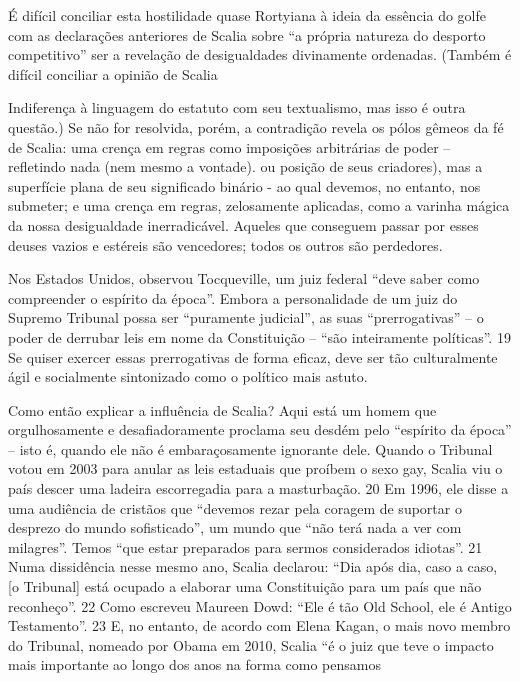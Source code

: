  \par 
É difícil conciliar esta hostilidade quase Rortyiana à ideia da essência do golfe com as declarações anteriores de Scalia sobre “a própria natureza do desporto competitivo” ser a revelação de desigualdades divinamente ordenadas. (Também é difícil conciliar a opinião de Scalia
 \par 
Indiferença à linguagem do estatuto com seu textualismo, mas isso é outra questão.) Se não for resolvida, porém, a contradição revela os pólos gêmeos da fé de Scalia: uma crença em regras como imposições arbitrárias de poder – refletindo nada (nem mesmo a vontade). ou posição de seus criadores), mas a superfície plana de seu significado binário - ao qual devemos, no entanto, nos submeter; e uma crença em regras, zelosamente aplicadas, como a varinha mágica da nossa desigualdade inerradicável. Aqueles que conseguem passar por esses deuses vazios e estéreis são vencedores; todos os outros são perdedores.
 \par 
Nos Estados Unidos, observou Tocqueville, um juiz federal “deve saber como compreender o espírito da época”. Embora a personalidade de um juiz do Supremo Tribunal possa ser “puramente judicial”, as suas “prerrogativas” – o poder de derrubar leis em nome da Constituição – “são inteiramente políticas”. {\color{blue}19} Se quiser exercer essas prerrogativas de forma eficaz, deve ser tão culturalmente ágil e socialmente sintonizado como o político mais astuto.
 \par 
Como então explicar a influência de Scalia? Aqui está um homem que orgulhosamente e desafiadoramente proclama seu desdém pelo “espírito da época” – isto é, quando ele não é embaraçosamente ignorante dele. Quando o Tribunal votou em 2003 para anular as leis estaduais que proíbem o sexo gay, Scalia viu o país descer uma ladeira escorregadia para a masturbação. {\color{blue}20} Em 1996, ele disse a uma audiência de cristãos que “devemos rezar pela coragem de suportar o desprezo do mundo sofisticado”, um mundo que “não terá nada a ver com milagres”. Temos “que estar preparados para sermos considerados idiotas”. {\color{blue}21} Numa dissidência nesse mesmo ano, Scalia declarou: “Dia após dia, caso a caso, [o Tribunal] está ocupado a elaborar uma Constituição para um país que não reconheço”. {\color{blue}22} Como escreveu Maureen Dowd: “Ele é tão Old School, ele é Antigo Testamento”. {\color{blue}23} E, no entanto, de acordo com Elena Kagan, o mais novo membro do Tribunal, nomeado por Obama em 2010, Scalia “é o juiz que teve o impacto mais importante ao longo dos anos na forma como pensamos
